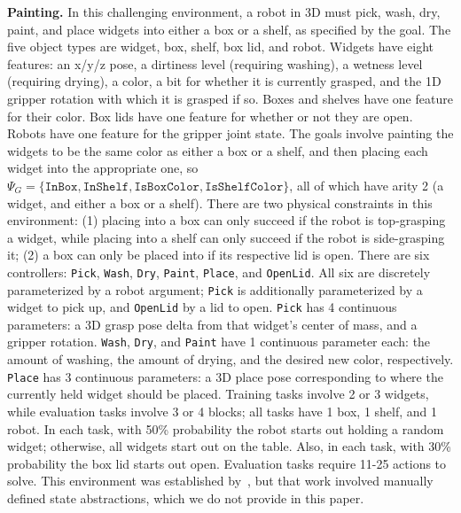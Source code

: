 \begin{tightlist}
    \item \textbf{Painting.} In this challenging environment, a robot in 3D must pick, wash, dry, paint, and place widgets into either a box or a shelf, as specified by the goal. The five object types are widget, box, shelf, box lid, and robot. Widgets have eight features: an x/y/z pose, a dirtiness level (requiring washing), a wetness level (requiring drying), a color, a bit for whether it is currently grasped, and the 1D gripper rotation with which it is grasped if so. Boxes and shelves have one feature for their color. Box lids have one feature for whether or not they are open. Robots have one feature for the gripper joint state. The goals involve painting the widgets to be the same color as either a box or a shelf, and then placing each widget into the appropriate one, so $\Psi_G = \{\texttt{InBox}, \texttt{InShelf}, \texttt{IsBoxColor}, \texttt{IsShelfColor}\}$, all of which have arity 2 (a widget, and either a box or a shelf). There are two physical constraints in this environment: (1) placing into a box can only succeed if the robot is top-grasping a widget, while placing into a shelf can only succeed if the robot is side-grasping it; (2) a box can only be placed into if its respective lid is open. There are six controllers: \texttt{Pick}, \texttt{Wash}, \texttt{Dry}, \texttt{Paint}, \texttt{Place}, and \texttt{OpenLid}. All six are discretely parameterized by a robot argument; \texttt{Pick} is additionally parameterized by a widget to pick up, and \texttt{OpenLid} by a lid to open. \texttt{Pick} has 4 continuous parameters: a 3D grasp pose delta from that widget's center of mass, and a gripper rotation. \texttt{Wash}, \texttt{Dry}, and \texttt{Paint} have 1 continuous parameter each: the amount of washing, the amount of drying, and the desired new color, respectively. \texttt{Place} has 3 continuous parameters: a 3D place pose corresponding to where the currently held widget should be placed. Training tasks involve 2 or 3 widgets, while evaluation tasks involve 3 or 4 blocks; all tasks have 1 box, 1 shelf, and 1 robot. In each task, with 50\% probability the robot starts out holding a random widget; otherwise, all widgets start out on the table. Also, in each task, with 30\% probability the box lid starts out open. Evaluation tasks require 11-25 actions to solve. This environment was established by~\citet{silver2021learning}, but that work involved manually defined state abstractions, which we do not provide in this paper.

\end{tightlist}
